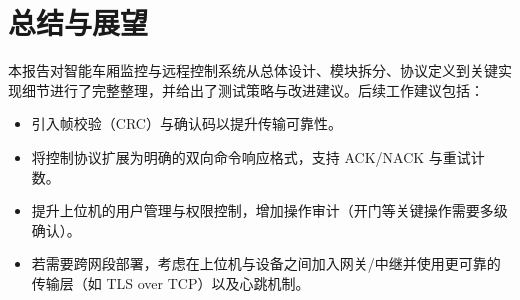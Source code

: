 \documentclass[12pt]{article}
\begin{document}

\section{总结与展望}
本报告对智能车厢监控与远程控制系统从总体设计、模块拆分、协议定义到关键实现细节进行了完整整理，并给出了测试策略与改进建议。后续工作建议包括：
\begin{itemize}
\item 引入帧校验（CRC）与确认码以提升传输可靠性。
\item 将控制协议扩展为明确的双向命令响应格式，支持 ACK/NACK 与重试计数。
\item 提升上位机的用户管理与权限控制，增加操作审计（开门等关键操作需要多级确认）。
\item 若需要跨网段部署，考虑在上位机与设备之间加入网关/中继并使用更可靠的传输层（如 TLS over TCP）以及心跳机制。
\end{itemize}
\end{document}
